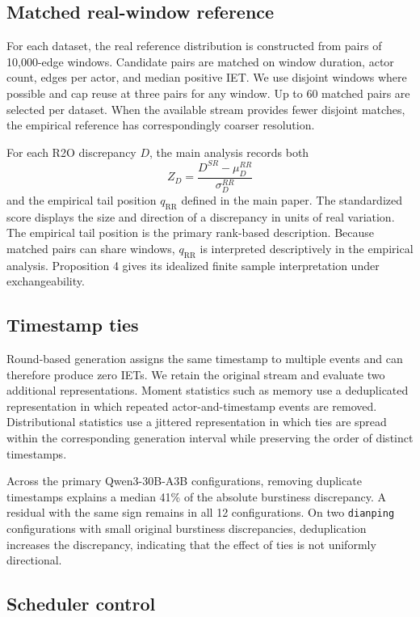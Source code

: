 \subsection{Matched real-window reference}

For each dataset, the real reference distribution is constructed from pairs of
10,000-edge windows. Candidate pairs are matched on window duration, actor
count, edges per actor, and median positive IET. We use disjoint windows where
possible and cap reuse at three pairs for any window. Up to 60 matched pairs
are selected per dataset. When the available stream provides fewer disjoint
matches, the empirical reference has correspondingly coarser resolution.

For each R2O discrepancy $D$, the main analysis records both
\[
Z_D=
\frac{D^{SR}-\mu_D^{RR}}{\sigma_D^{RR}}
\]
and the empirical tail position $q_{\mathrm{RR}}$ defined in the main paper.
The standardized score displays the size and direction of a discrepancy in
units of real variation. The empirical tail position is the primary rank-based
description. Because matched pairs can share windows, $q_{\mathrm{RR}}$ is
interpreted descriptively in the empirical analysis. Proposition 4 gives its
idealized finite sample interpretation under exchangeability.



\subsection{Timestamp ties}

Round-based generation assigns the same timestamp to multiple events and can
therefore produce zero IETs. We retain the original stream and evaluate two
additional representations. Moment statistics such as memory use a
deduplicated representation in which repeated actor-and-timestamp events are
removed. Distributional statistics use a jittered representation in which ties
are spread within the corresponding generation interval while preserving the
order of distinct timestamps.

Across the primary Qwen3-30B-A3B configurations, removing duplicate
timestamps explains a median 41\% of the absolute burstiness discrepancy. A
residual with the same sign remains in all 12 configurations. On two
\texttt{dianping} configurations with small original burstiness discrepancies,
deduplication increases the discrepancy, indicating that the effect of ties is
not uniformly directional.

\subsection{Scheduler control}

